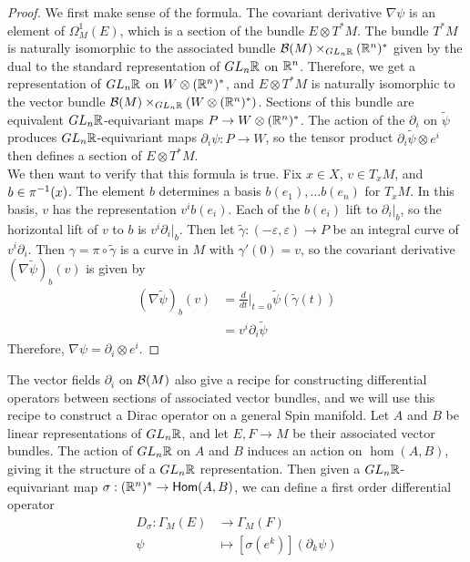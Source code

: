 %
\begin{proof}
 We first make sense of the formula. The covariant derivative $\nabla\psi$ is
 an element of $\Omega_M^1(E)$, which is a section of the bundle $E \otimes T^*M$.
 The bundle $T^*M$ is naturally isomorphic to the associated bundle
 $\mathcal{B}(M) \times_{GL_n\mathbb{R}} (\mathbb{R}^n)^*$ given by the dual to the standard representation
 of $GL_n\mathbb{R}$ on $\mathbb{R}^n$. Therefore, we get a representation of $GL_n\mathbb{R}$ on
 $W \otimes (\mathbb{R}^n)^*$, and $E \otimes T^*M$ is naturally isomorphic to the vector
 bundle $\mathcal{B}(M) \times_{GL_n\mathbb{R}} (W \otimes (\mathbb{R}^n)^*)$. Sections of this bundle
 are equivalent $GL_n\mathbb{R}$-equivariant maps $P \to W \otimes (\mathbb{R}^n)^*$. The action
 of the $\partial_i$ on $\tilde{\psi}$ produces $GL_n\mathbb{R}$-equivariant maps
 $\partial_i\psi : P \to W$, so the tensor product
 $\partial_i\tilde{\psi} \otimes e^i$ then defines a section of $E \otimes T^*M$. \\

 We then want to verify that this formula is true. Fix $x \in X$, $v \in T_xM$,
 and $b \in \pi^{-1}(x)$. The element $b$ determines a basis $b(e_1), \ldots b(e_n)$
 for $T_xM$. In this basis, $v$ has the representation $v^ib(e_i)$. Each
 of the $b(e_i)$ lift to $\partial_i\vert_b$, so the horizontal lift of $v$ to $b$
 is $v^i\partial_i\vert_b$. Then let
 $\tilde{\gamma} : (-\varepsilon, \varepsilon) \to P$ be an integral curve of
 $v^i\partial_i$. Then $\gamma = \pi \circ \tilde{\gamma}$ is a curve in $M$
 with $\gamma'(0) = v$, so the covariant derivative $(\nabla\tilde{\psi})_b(v)$ is
 given by
 \begin{align*}
  (\nabla\tilde{\psi})_b(v) & = \frac{d}{dt}\bigg\vert_{t=0}
  \tilde{\psi}(\tilde{\gamma}(t)) \\
                            & = v^i\partial_i\tilde{\psi}
 \end{align*}
 Therefore, $\nabla\psi = \partial_i \otimes e^i$.
\end{proof}
%
The vector fields $\partial_i$ on $\mathcal{B}(M)$ also give a recipe for constructing
differential operators between sections of associated vector bundles,
and we will use this recipe to construct a Dirac operator on a general Spin
manifold. Let $A$ and $B$ be linear representations of $GL_n\mathbb{R}$, and let
$E,F \to M$ be their associated vector bundles. The action of $GL_n\mathbb{R}$ on
$A$ and $B$ induces an action on $\hom(A,B)$, giving it the structure
of a $GL_n\mathbb{R}$ representation. Then given a $GL_n\mathbb{R}$-equivariant map
$\sigma : (\mathbb{R}^n)^* \to \mathsf{Hom}(A,B)$, we can define a first order differential
operator
\begin{align*}
 D_\sigma : \Gamma_M(E) & \to \Gamma_M(F)                       \\
 \psi                   & \mapsto [\sigma(e^k)](\partial_k\psi)
\end{align*}
